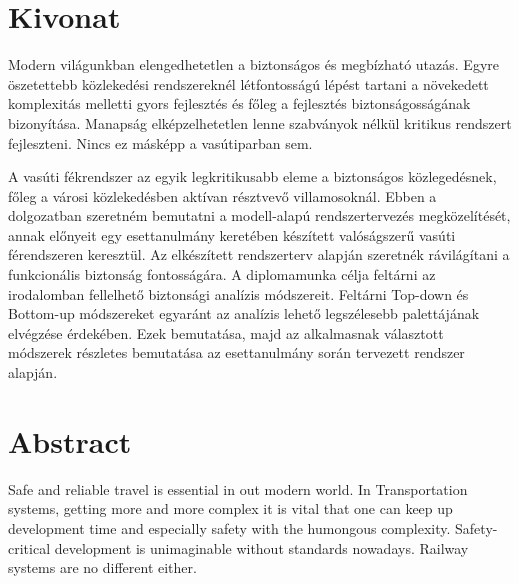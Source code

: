 \setcounter{page}{1}

\selecthungarian

\chapter*{Kivonat}
Modern világunkban elengedhetetlen a biztonságos és megbízható utazás.
Egyre öszetettebb közlekedési rendszereknél létfontosságú lépést tartani a növekedett komplexitás melletti gyors fejlesztés és főleg a fejlesztés biztonságosságának bizonyítása.
Manapság elképzelhetetlen lenne szabványok nélkül kritikus rendszert fejleszteni.
Nincs ez másképp a vasútiparban sem.

A vasúti fékrendszer az egyik legkritikusabb eleme a biztonságos közlegedésnek, főleg a városi közlekedésben aktívan résztvevő villamosoknál.
Ebben a dolgozatban szeretném bemutatni a modell-alapú rendszertervezés megközelítését, annak előnyeit egy esettanulmány keretében készített valóságszerű vasúti férendszeren keresztül.
Az elkészített rendszerterv alapján szeretnék rávilágítani a funkcionális biztonság fontosságára.
A diplomamunka célja feltárni az irodalomban fellelhető biztonsági analízis módszereit.
Feltárni Top-down és Bottom-up módszereket egyaránt az analízis lehető legszélesebb palettájának elvégzése érdekében.
Ezek bemutatása, majd az alkalmasnak választott módszerek részletes bemutatása az esettanulmány során tervezett rendszer alapján.



\vfill
\selectenglish


\chapter*{Abstract}

Safe and reliable travel is essential in out modern world.
In Transportation systems, getting more and more complex it is vital that one can keep up development time and especially safety with the humongous complexity.
Safety-critical development is unimaginable without standards nowadays.
Railway systems are no different either.

